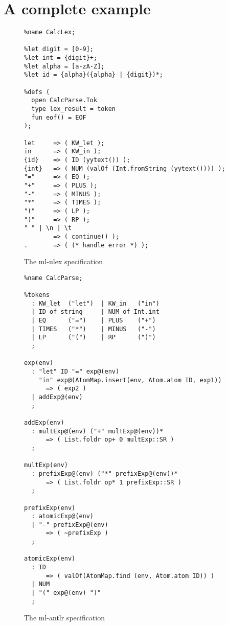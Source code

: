 \chapter{A complete example}

\begin{figure}
\begin{verbatim}
%name CalcLex;

%let digit = [0-9];
%let int = {digit}+;
%let alpha = [a-zA-Z];
%let id = {alpha}({alpha} | {digit})*;

%defs (
  open CalcParse.Tok
  type lex_result = token
  fun eof() = EOF
);

let     => ( KW_let );
in      => ( KW_in );
{id}    => ( ID (yytext()) );
{int}   => ( NUM (valOf (Int.fromString (yytext()))) );
"="     => ( EQ );
"+"     => ( PLUS );
"-"     => ( MINUS );
"*"     => ( TIMES );
"("     => ( LP );
")"     => ( RP );
" " | \n | \t
        => ( continue() );
.       => ( (* handle error *) );
\end{verbatim}
\caption{The ml-ulex specification}
\end{figure}

\begin{figure}
\begin{verbatim}
%name CalcParse;

%tokens
  : KW_let  ("let")  | KW_in   ("in")
  | ID of string     | NUM of Int.int
  | EQ      ("=")    | PLUS    ("+")
  | TIMES   ("*")    | MINUS   ("-")
  | LP      ("(")    | RP      (")")
  ;
  
exp(env)
  : "let" ID "=" exp@(env) 
    "in" exp@(AtomMap.insert(env, Atom.atom ID, exp1))
      => ( exp2 )
  | addExp@(env)
  ;
  
addExp(env)
  : multExp@(env) ("+" multExp@(env))*
      => ( List.foldr op+ 0 multExp::SR )
  ;
  
multExp(env)
  : prefixExp@(env) ("*" prefixExp@(env))*
      => ( List.foldr op* 1 prefixExp::SR )
  ;
  
prefixExp(env)
  : atomicExp@(env)
  | "-" prefixExp@(env)
      => ( ~prefixExp )
  ;
  
atomicExp(env)
  : ID  
      => ( valOf(AtomMap.find (env, Atom.atom ID)) )
  | NUM
  | "(" exp@(env) ")"
  ;
\end{verbatim}
\caption{The ml-antlr specification}
\end{figure}